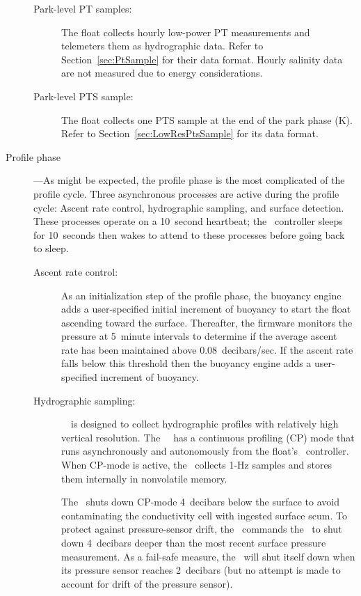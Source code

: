 \begin{description}
\begin{description}
  \item[Park-level PT samples:] The float collects hourly low-power PT
    measurements and telemeters them as hydrographic data.  Refer to
    Section~\ref{sec:PtSample} for their data format.  Hourly salinity data
    are not measured due to energy considerations.
    
  \item[Park-level PTS sample:] The float collects one PTS sample at the end
    of the park phase (K).  Refer to Section~\ref{sec:LowResPtsSample} for
    its data format.
  \end{description}
  
\item[Profile phase\label{ProfilePhase}]---As might be expected, the profile
  phase is the most complicated of the profile cycle.  Three asynchronous
  processes are active during the profile cycle: Ascent rate control,
  hydrographic sampling, and surface detection.  These processes operate on
  a 10~second heartbeat; the \apf\ controller sleeps for 10~seconds then
  wakes to attend to these processes before going back to sleep.

  \begin{description}
  \item[Ascent rate control:] As an initialization step of the profile
    phase, the buoyancy engine adds a user-specified initial increment of
    buoyancy to start the float ascending toward the surface.  Thereafter,
    the firmware monitors the pressure at 5~minute intervals to determine if
    the average ascent rate has been maintained above 0.08~decibars/sec.  If
    the ascent rate falls below this threshold then the buoyancy engine adds
    a user-specified increment of buoyancy.
    
  \item[Hydrographic sampling:] \iridium\ \apex\ is designed to collect
    hydrographic profiles with relatively high vertical resolution.  The
    \sbe\ \ctd\ has a continuous profiling (CP) mode that runs
    asynchronously and autonomously from the float's \apf\ controller.  When
    CP-mode is active, the \ctd\ collects 1-Hz samples and stores them
    internally in nonvolatile memory.  
    
    The \apf\ shuts down CP-mode 4~decibars below the surface to avoid
    contaminating the conductivity cell with ingested surface scum.  To
    protect against pressure-sensor drift, the \apf\ commands the \sbe\ to
    shut down 4~decibars deeper than the most recent surface pressure
    measurement.  As a fail-safe measure, the \sbe\ will shut itself down
    when its pressure sensor reaches 2~decibars (but no attempt is made to
    account for drift of the pressure sensor).
    

\end{description}
\end{description}
